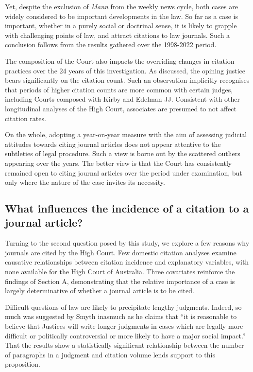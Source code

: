 Yet, despite the exclusion of \textit{Mann} from the weekly news cycle, both cases are widely considered to be important developments in the law. So far as a case is important, whether in a purely social or doctrinal sense, it is likely to grapple with challenging points of law, and attract citations to law journals. Such a conclusion follows from the results gathered over the 1998-2022 period.

The composition of the Court also impacts the overriding changes in citation practices over the 24 years of this investigation. As discussed, the opining justice bears significantly on the citation count. Such an observation implicitly recognises that periods of higher citation counts are more common with certain judges, including Courts composed with Kirby and Edelman JJ. Consistent with other longitudinal analyses of the High Court, associates are presumed to not affect citation rates.

On the whole, adopting a year-on-year measure with the aim of assessing judicial attitudes towards citing journal articles does not appear attentive to the subtleties of legal procedure. Such a view is borne out by the scattered outliers appearing over the years. The better view is that the Court has consistently remained open to citing journal articles over the period under examination, but only where the nature of the case invites its necessity.

\subsection{What influences the incidence of a citation to a journal article?}

Turning to the second question posed by this study, we explore a few reasons why journals are cited by the High Court. Few domestic citation analyses examine causative relationships between citation incidence and explanatory variables, with none available for the High Court of Australia. Three covariates reinforce the findings of Section A, demonstrating that the relative importance of a case is largely determinative of whether a journal article is to be cited.

Difficult questions of law are likely to precipitate lengthy judgments. Indeed, so much was suggested by Smyth inasmuch as he claims that ``it is reasonable to believe that Justices will write longer judgments in cases which are legally more difficult or politically controversial or more likely to have a major social impact.'' That the results show a statistically significant relationship between the number of paragraphs in a judgment and citation volume lends support to this proposition.

